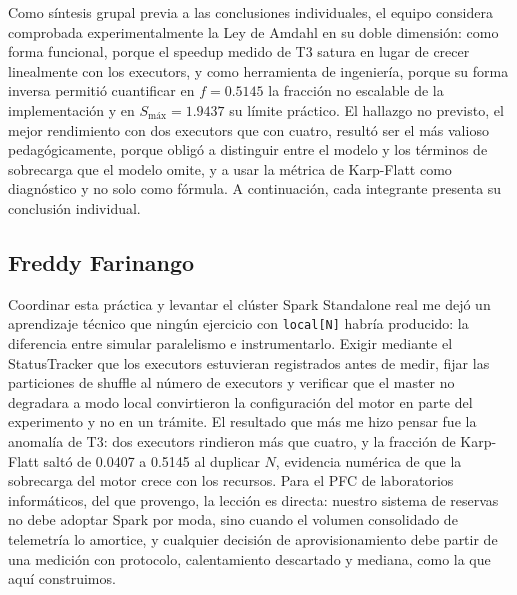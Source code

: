\documentclass[10pt,journal]{IEEEtran}
\begin{document}
Como s\'intesis grupal previa a las conclusiones individuales, el equipo
considera comprobada experimentalmente la Ley de Amdahl en su doble
dimensi\'on: como forma funcional, porque el speedup medido de T3 satura en
lugar de crecer linealmente con los executors, y como herramienta de
ingenier\'ia, porque su forma inversa permiti\'o cuantificar en
$f = \num{0.5145}$ la fracci\'on no escalable de la implementaci\'on y en
$S_{\text{m\'ax}} = \num{1.9437}$ su l\'imite pr\'actico. El hallazgo no
previsto, el mejor rendimiento con dos executors que con cuatro, result\'o ser
el m\'as valioso pedag\'ogicamente, porque oblig\'o a distinguir entre el
modelo y los t\'erminos de sobrecarga que el modelo omite, y a usar la
m\'etrica de Karp-Flatt como diagn\'ostico y no solo como f\'ormula. A
continuaci\'on, cada integrante presenta su conclusi\'on individual.

\subsection{Freddy Farinango}
Coordinar esta pr\'actica y levantar el cl\'uster Spark Standalone real me
dej\'o un aprendizaje t\'ecnico que ning\'un ejercicio con \texttt{local[N]}
habr\'ia producido: la diferencia entre simular paralelismo e instrumentarlo.
Exigir mediante el StatusTracker que los executors estuvieran registrados antes
de medir, fijar las particiones de shuffle al n\'umero de executors y verificar
que el master no degradara a modo local convirtieron la configuraci\'on del
motor en parte del experimento y no en un tr\'amite. El resultado que m\'as me
hizo pensar fue la anomal\'ia de T3: dos executors rindieron m\'as que cuatro,
y la fracci\'on de Karp-Flatt salt\'o de \num{0.0407} a \num{0.5145} al
duplicar $N$, evidencia num\'erica de que la sobrecarga del motor crece con los
recursos. Para el PFC de laboratorios inform\'aticos, del que provengo, la
lecci\'on es directa: nuestro sistema de reservas no debe adoptar Spark por
moda, sino cuando el volumen consolidado de telemetr\'ia lo amortice, y
cualquier decisi\'on de aprovisionamiento debe partir de una medici\'on con
protocolo, calentamiento descartado y mediana, como la que aqu\'i construimos.
\end{document}
